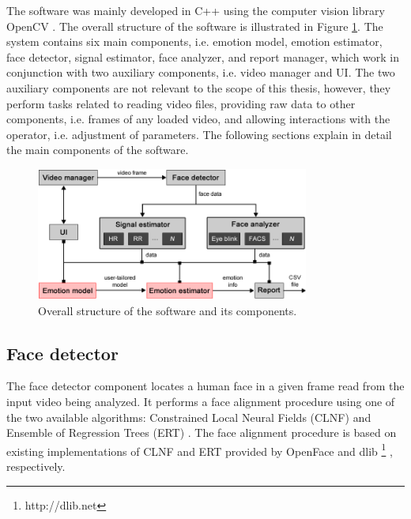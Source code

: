 The software was mainly developed in C++ using the computer vision library OpenCV \parencite{opencv_library}. The overall structure of the software is illustrated in Figure \ref{fig:tool-overall-structure}. The system contains six main components, i.e. emotion model, emotion estimator, face detector, signal estimator, face analyzer, and report manager, which work in conjunction with two auxiliary components, i.e. video manager and UI. The two auxiliary components are not relevant to the scope of this thesis, however, they perform tasks related to reading video files, providing raw data to other components, i.e. frames of any loaded video, and allowing interactions with the operator, i.e. adjustment of parameters. The following sections explain in detail the main components of the software.

\begin{figure}
    \centering
    \includegraphics[width=0.8\textwidth]{Content/figures/tool-overall-structure.png}
    \caption{Overall structure of the software and its components.}
    \label{fig:tool-overall-structure}
\end{figure}

\subsection{Face detector}

The face detector component locates a human face in a given frame read from the input video being analyzed. It performs a face alignment procedure using one of the two available algorithms: Constrained Local Neural Fields (CLNF) \parencite{baltrusaitis2013constrained} and Ensemble of Regression Trees (ERT) \parencite{kazemi2014one}. The face alignment procedure is based on existing implementations of CLNF and ERT provided by OpenFace \parencite{baltruvsaitis2016openface} and dlib \footnote{http://dlib.​net} \parencite{dlib09}, respectively.

